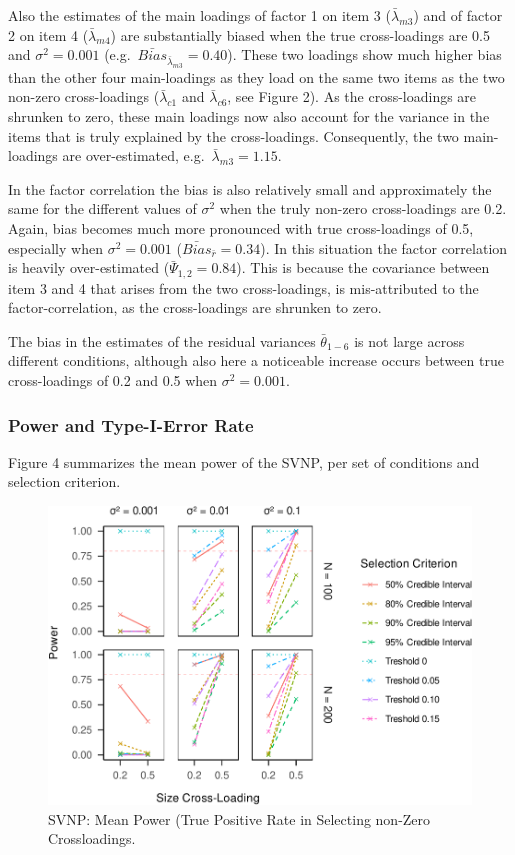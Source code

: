 \documentclass[
  man, donotrepeattitle,floatsintext]{apa6}
\begin{document}
Also the estimates of the main loadings of factor 1 on item 3 (\(\bar{\lambda}_{m 3}\)) and of factor 2 on item 4 (\(\bar{\lambda}_{m 4}\)) are substantially biased when the true cross-loadings are 0.5 and \(\sigma^2 = 0.001\) (e.g.~\(\bar{Bias}_{\bar{\lambda}_{m 3}} = 0.40\)). These two loadings show much higher bias than the other four main-loadings as they load on the same two items as the two non-zero cross-loadings (\(\bar{\lambda}_{c 1}\) and \(\bar{\lambda}_{c 6}\), see Figure 2). As the cross-loadings are shrunken to zero, these main loadings now also account for the variance in the items that is truly explained by the cross-loadings. Consequently, the two main-loadings are over-estimated, e.g.~\(\bar{\lambda}_{m 3} = 1.15\).

In the factor correlation the bias is also relatively small and approximately the same for the different values of \(\sigma^2\) when the truly non-zero cross-loadings are 0.2. Again, bias becomes much more pronounced with true cross-loadings of 0.5, especially when \(\sigma^2 = 0.001\) (\(\bar{Bias}_{\bar{r}} = 0.34\)). In this situation the factor correlation is heavily over-estimated (\(\bar{\Psi}_{1,2} = 0.84\)). This is because the covariance between item 3 and 4 that arises from the two cross-loadings, is mis-attributed to the factor-correlation, as the cross-loadings are shrunken to zero.

The bias in the estimates of the residual variances \(\bar{\theta}_{1-6}\) is not large across different conditions, although also here a noticeable increase occurs between true cross-loadings of 0.2 and 0.5 when \(\sigma^2 = 0.001\).

\hypertarget{power-and-type-i-error-rate-1}{%
\subsubsection{Power and Type-I-Error Rate}\label{power-and-type-i-error-rate-1}}

Figure 4 summarizes the mean power of the SVNP, per set of conditions and selection criterion.

\begin{figure}
\centering
\includegraphics{JMBKoch_thesis_files/figure-latex/unnamed-chunk-4-1.pdf}
\caption{\label{fig:unnamed-chunk-4}SVNP: Mean Power (True Positive Rate in Selecting non-Zero Crossloadings.}
\end{figure}
\end{document}
